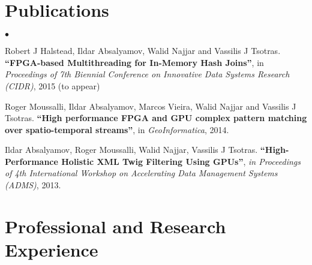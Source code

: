 \documentclass[margin,line]{res}
\newenvironment{list2}{
  \begin{list}{$\bullet$}{%
      \setlength{\itemsep}{0in}
      \setlength{\parsep}{0in} \setlength{\parskip}{0in}
      \setlength{\topsep}{0in} \setlength{\partopsep}{0in} 
      \setlength{\leftmargin}{0.2in}}}{\end{list}}
\begin{document}
\begin{resume}
\section{\sc Publications}
\begin{list2}
	\item Robert J Halstead, Ildar Absalyamov, Walid Najjar and Vassilis J Tsotras. {\bf ``FPGA-based Multithreading for In-Memory Hash Joins''}, in {\it Proceedings of 7th Biennial Conference on Innovative Data Systems Research (CIDR)}, 2015 (to appear)
	\item Roger Moussalli, Ildar Absalyamov, Marcos Vieira, Walid Najjar and Vassilis J Tsotras. {\bf ``High performance FPGA and GPU complex pattern matching over spatio-temporal streams''}, in {\it GeoInformatica}, 2014. 
	\item Ildar Absalyamov, Roger Moussalli, Walid Najjar, Vassilis J Tsotras. {\bf ``High-Performance Holistic XML Twig Filtering Using GPUs''}, { \it in Proceedings of 4th International Workshop on Accelerating Data Management Systems (ADMS)}, 2013.
\end{list2}
% 
% 

\section{\sc Professional and Research Experience}


\end{resume}
\end{document}
